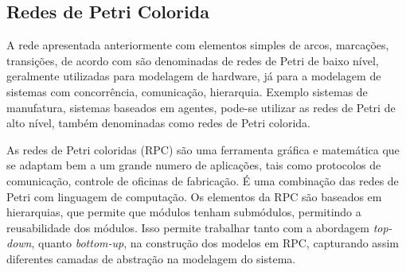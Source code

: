 \subsection{Redes de Petri Colorida}
A rede apresentada anteriormente com elementos simples de arcos, marcações, transições, de acordo com \cite{jensen} são denominadas de redes de Petri de baixo nível, geralmente utilizadas para modelagem de hardware, já para a modelagem de sistemas com concorrência, comunicação, hierarquia. Exemplo  sistemas de manufatura, sistemas baseados em agentes, pode-se utilizar as redes de Petri de alto nível, também denominadas como redes de Petri colorida. 

As redes de Petri  coloridas (\gls{RPC}) são uma ferramenta gráfica e matemática que se adaptam bem a um grande numero de aplicações, tais como protocolos de comunicação, controle de oficinas de fabricação. É uma combinação das redes de Petri com linguagem de computação. Os elementos da \gls{RPC} são baseados em hierarquias, que permite que módulos tenham submódulos, permitindo a reusabilidade dos módulos. Isso permite trabalhar tanto com a abordagem \textit{top-down}, quanto \textit{bottom-up}, na construção dos modelos em RPC, capturando assim diferentes camadas de abstração na modelagem do sistema.

